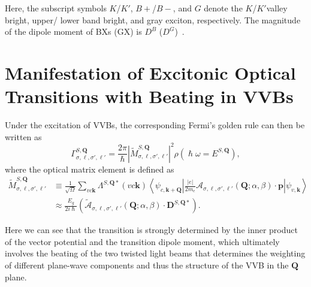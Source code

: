 \noindent
Here, the subscript symbols $K$/$K'$, $B+$/$B-$, and $G$ denote the $K$/$K'$valley bright, upper/ lower band bright, and gray exciton, respectively. The magnitude of the dipole moment of BXs (GX) is $D^{B}$ ($D^G$)~\cite{peng2022tailoring, sanchez2024enhanced}. 

%
%
%
%
%
%

\section{Manifestation of Excitonic Optical Transitions with Beating in VVBs}
Under the excitation of VVBs, the corresponding Fermi's golden rule can then be written as~\cite{sanchez2024enhanced}
\begin{equation}
\Gamma_{\sigma, \ell, \sigma', \ell'}^{S, \boldsymbol{Q}}
=
\frac{2\pi}{\hslash}
\left|
\tilde{M}_{\sigma, \ell, \sigma', \ell'}^{S, \boldsymbol{Q}}
\right|^2
\rho(\hslash\omega=E^{S, \boldsymbol{Q}}),
\label{transitionrate}
\end{equation}
where the optical matrix element is defined as
\begin{align}
\tilde{M}_{\sigma, \ell, \sigma', \ell'}^{S, \boldsymbol{Q}}
&\equiv
\frac{1}{\sqrt{\Omega}} 
\sum_{vc\boldsymbol{k}} 
\Lambda^{S,\boldsymbol{Q}*}(vc\boldsymbol{k}) 
\left\langle
\psi_{c, \boldsymbol{k}+\boldsymbol{Q}}
\left|
\frac{|e|}{2m_e}
\boldsymbol{\mathcal{A}}_{\sigma, \ell, \sigma', \ell'}(\boldsymbol{Q};\alpha,\beta)
\cdot
\boldsymbol{p}
\right|
\psi_{v, \boldsymbol{k}}
\right\rangle \nonumber \\
&\approx
\frac{E_g}{2i\hslash}
\left(
\tilde{\boldsymbol{\mathcal{A}}}_{\sigma, \ell, \sigma', \ell'}(\boldsymbol{Q};\alpha,\beta)
\cdot 
\boldsymbol{D}^{S, \boldsymbol{Q} *}
\right).
\label{matrixelement}
\end{align}

\noindent
Here we can see that the transition is strongly determined by the inner product of the vector potential and the transition dipole moment, which ultimately involves the beating of the two twisted light beams that determines the weighting of different plane-wave components and thus the structure of the VVB in the $\boldsymbol{Q}$ plane.

